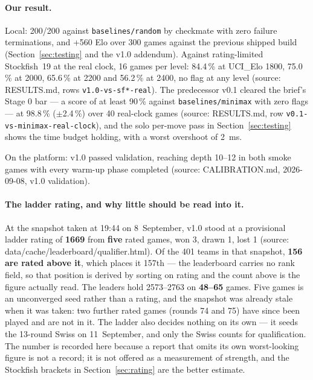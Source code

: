 \documentclass[11pt,a4paper]{article}
\newcommand{\src}[1]{{\small(source: #1)}}
\newcommand{\code}[1]{\texttt{#1}}
\begin{document}
\paragraph{Our result.} Local: 200/200 against \code{baselines/random} by checkmate with zero failure
terminations, and +560 Elo over 300 games against the previous shipped build (Section~\ref{sec:testing}
and the v1.0 addendum). Against rating-limited Stockfish~19 at the real clock, 16 games per level: 84.4\,\%
at UCI\_Elo 1800, 75.0\,\% at 2000, 65.6\,\% at 2200 and 56.2\,\% at 2400, no flag at any level
\src{RESULTS.md, rows \code{v1.0-vs-sf*-real}}. The predecessor v0.1 cleared the brief's Stage 0 bar --- a
score of at least 90\,\% against \code{baselines/minimax} with zero flags --- at 98.8\,\% ($\pm$2.4\,\%)
over 40 real-clock games \src{RESULTS.md, row \code{v0.1-vs-minimax-real-clock}}, and the solo per-move
pass in Section~\ref{sec:testing} shows the time budget holding, with a worst overshoot of 2~ms.

On the platform: v1.0 passed validation, reaching depth 10--12 in both smoke games with every warm-up
phase completed \src{CALIBRATION.md, 2026-09-08, v1.0 validation}.

\paragraph{The ladder rating, and why little should be read into it.} At the snapshot taken at 19:44
on 8~September, v1.0 stood at a provisional ladder rating of \textbf{1669} from \textbf{five} rated
games, won 3, drawn 1, lost 1 \src{data/cache/leaderboard/qualifier.html}. Of the 401 teams in that
snapshot, \textbf{156 are rated above it}, which places it 157th --- the leaderboard carries no rank
field, so that position is derived by sorting on rating and the count above is the figure actually
read. The leaders hold 2573--2763 on \textbf{48--65} games. Five games is an unconverged seed rather than a
rating, and the snapshot was already stale when it was taken: two further rated games (rounds 74 and
75) have since been played and are not in it. The ladder also decides nothing on its own --- it seeds
the 13-round Swiss on 11~September, and only the Swiss counts for qualification. The number is
recorded here because a report that omits its own worst-looking figure is not a record; it is not
offered as a measurement of strength, and the Stockfish brackets in Section~\ref{sec:rating} are the
better estimate.
\end{document}
